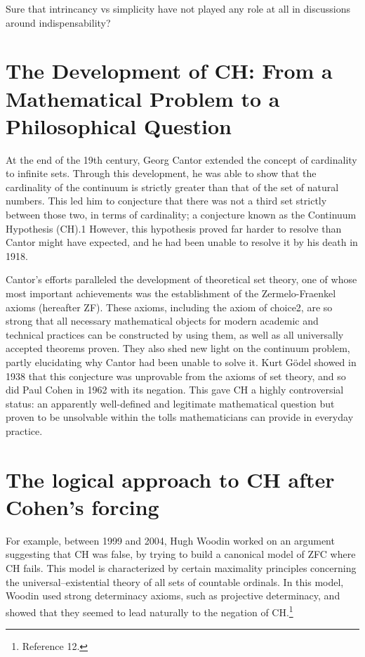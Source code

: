 \documentclass[11pt,a4paper]{book}
\theoremstyle{plain}
\begin{document}
Sure that intrincancy vs simplicity have not played any role at all in discussions around indispensability?
\section{The Development of CH: From a Mathematical Problem to a Philosophical Question}

At the end of the 19th century, Georg Cantor extended the concept of cardinality to infinite sets. Through this development, he was able to show that the cardinality of the continuum is strictly greater than that of the set of natural numbers. This led him to conjecture that there was not a third set strictly between those two, in terms of cardinality; a conjecture known as the Continuum Hypothesis (CH).1 However, this hypothesis proved far harder to resolve than Cantor might have expected, and he had been unable to resolve it by his death in 1918. 

Cantor’s efforts paralleled the development of theoretical set theory, one of whose most important achievements was the establishment of the Zermelo-Fraenkel axioms (hereafter ZF). These axioms, including the axiom of choice2, are so strong that all necessary mathematical objects for modern academic and technical practices can be constructed by using them, as well as all universally accepted theorems proven. They also shed new light on the continuum problem, partly elucidating why Cantor had been unable to solve it. Kurt Gödel showed in 1938 that this conjecture was unprovable from the axioms of set theory, and so did Paul Cohen in 1962 with its negation. This gave CH a highly controversial status: an apparently well-defined and legitimate mathematical question but proven to be unsolvable within the tolls mathematicians can provide in everyday practice.

\section{The logical approach to CH after Cohen's forcing}
For example, between 1999 and 2004, Hugh Woodin worked on an argument suggesting that CH was false, by trying to build a canonical model of ZFC where CH fails. This model is characterized by certain maximality principles concerning the universal--existential theory of all sets of countable ordinals. In this model, Woodin used strong determinacy axioms, such as projective determinacy, and showed that they seemed to lead naturally to the negation of CH.\footnote{Reference 12.}
\end{document}
